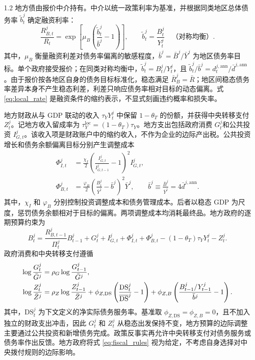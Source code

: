 \documentclass[12pt,UTF8]{ctexart}
\newcommand{\DS}{\mathrm{DS}}
\begin{document}
\begin{spacing}{1.2}
		地方债由报价中介持有。中介以统一政策利率为基准，并根据同类地区总体债务率 $\widetilde b_t^j$ 确定融资利率：
		\begin{equation}
			\frac{R_{B,t}^j}{R_t}=\exp\left[\mu_B\left(\frac{\widetilde b_t^j}{\bar b^j}-1\right)\right],
			\qquad \widetilde b_t^j=\frac{B_t^j}{Y_t^j}\quad\text{（对称均衡）}.
			\label{eq:local_rate}
		\end{equation}
		其中，$\mu_B$ 衡量融资利差对债务率偏离的敏感程度，$\bar b^j=\bar B^j/\bar Y^j$ 为地区债务率目标。单个政府接受报价；在同类对称均衡中，$\widetilde b_t^j=B_t^j/Y_t^j$，且 $\widetilde b_t^j/\bar b^j=d_t^{j,\mathrm{ann}}/\bar d^{j,\mathrm{ann}}$。由于报价按各地区自身的债务目标标准化，稳态满足 $\bar R_B^j=\bar R$；地区间稳态债务率差异本身不产生稳态利差，利差只响应债务率相对目标的动态偏离。式 \eqref{eq:local_rate} 是融资条件的缩约表示，不显式刻画违约概率和损失率。
		
		地方财政从与 GDP 联动的收入 $\tau_Y Y_t^j$ 中保留 $1-\theta_T$ 的份额，并获得中央转移支付 $Z_t^j$。记地方收入留成率为 $\tau_Y^{\mathrm{loc}}=(1-\theta_T)\tau_Y$。地方支出包括政府消费 $G_t^j$和公共投资 $I_{G,t}^j$。该收入项是财政账户中的缩约收入，不作为企业的边际产出税。公共投资增长和债务余额偏离目标分别产生调整成本
		\begin{align}
			\Phi_{I,t}^j&=\frac{\chi_I}{2}\left(\frac{I_{G,t}^j}{I_{G,t-1}^j}-1\right)^2I_{G,t}^j,
			\label{eq:PhiI}\\
			\Phi_{B,t}^j&=\frac{\varphi_B}{2}
			\left(\frac{B_t^j}{\bar Y^j}-\bar b^j\right)^2\bar Y^j,
			\qquad \bar b^j\equiv\frac{\bar B^j}{\bar Y^j}=4\bar d^{j,\mathrm{ann}}.
			\label{eq:PhiB}
		\end{align}
		其中，$\chi_I$ 和 $\varphi_B$ 分别控制投资调整成本和债务管理成本。后者以稳态 GDP 为尺度，惩罚债务余额相对于目标的偏离。两项调整成本均消耗最终品。地方政府的逐期预算约束为
		\begin{equation}
			B_t^j=\frac{R_{B,t-1}^j}{\Pi_t^j}B_{t-1}^j+G_t^j+I_{G,t}^j+\Phi_{I,t}^j+\Phi_{B,t}^j
			-(1-\theta_T)\tau_Y Y_t^j-Z_t^j.
			\label{eq:gov_budget}
		\end{equation}
		政府消费和中央转移支付遵循
		\begin{align}
			\log\frac{G_t^j}{\bar G^j}
			&=\rho_G\log\frac{G_{t-1}^j}{\bar G^j}, \notag\\
			\log\frac{Z_t^j}{\bar Z^j}
			&=\rho_Z\log\frac{Z_{t-1}^j}{\bar Z^j}
			+\phi_{Z,\DS}\left(\frac{\DS_t^j}{\overline{\DS}^j}-1\right)
			+\phi_{Z,B}\left(\frac{B_{t-1}^j/Y_{t-1}^j}{\bar b^j}-1\right).
			\label{eq:fiscal_rules}
		\end{align}
		其中，$\DS_t^j$ 为下文定义的净实际债务服务率。基准取 $\phi_{Z,\DS}=\phi_{Z,B}=0$，且不加入独立的财政支出冲击，因此 $G_t^j$ 和 $Z_t^j$ 从稳态出发保持不变，地方预算的边际调整主要通过公共投资和新增债务完成。政策反事实再允许中央转移支付对债务服务或债务率作出反馈。地方政府将式 \eqref{eq:fiscal_rules} 视为给定，不考虑自身选择对中央拨付规则的边际影响。
		

\end{spacing}
\end{document}
